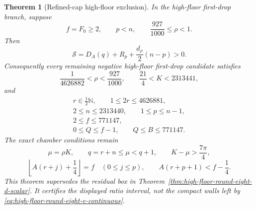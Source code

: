 \documentclass[11pt]{article}
\newtheorem{theorem}{Theorem}[section]
\theoremstyle{remark}
\newcommand{\N}{\mathbb N}
\begin{document}
\begin{theorem}[Refined-cap high-floor exclusion]
\label{thm:high-floor-round-eight-e-scalar}
In the high-floor first-drop branch, suppose
\[
 f=F_0\geq2,\qquad p<n,\qquad
 \frac{927}{1000}\leq\rho<1.
\]
Then
\begin{equation}
 \boxed{
 \mathcal S=D_A(q)+R_p+\frac{d_\rho}{2}(n-p)>0.}
 \label{eq:high-floor-round-eight-e-positive}
\end{equation}
Consequently every remaining negative high-floor first-drop candidate
satisfies
\begin{equation}
 \boxed{
 \frac1{4626882}<\rho<\frac{927}{1000},\qquad
 \frac{21}{4}<K<2313441,}
 \label{eq:high-floor-round-eight-e-continuous}
\end{equation}
and
\begin{equation}
 \boxed{
 \begin{gathered}
 r\in\tfrac12\N,\qquad 1\leq2r\leq4626881,\\
 2\leq n\leq2313440,\qquad 1\leq p\leq n-1,\\
 2\leq f\leq771147,\\
 0\leq Q\leq f-1,\qquad Q\leq B\leq771147.
 \end{gathered}}
 \label{eq:high-floor-round-eight-e-discrete}
\end{equation}
The exact chamber conditions remain
\begin{equation}
 \mu=\rho K,\qquad q=r+n\leq\mu<q+1,\qquad
 K-\mu>\frac{7\pi}{4},
 \label{eq:high-floor-round-eight-e-chamber-one}
\end{equation}
\begin{equation}
 \left\lfloor A(r+j)+\frac14\right\rfloor=f
 \quad(0\leq j\leq p),\qquad
 A(r+p+1)<f-\frac14.
 \label{eq:high-floor-round-eight-e-chamber-two}
\end{equation}
This theorem supersedes the residual box in
Theorem~\ref{thm:high-floor-round-eight-d-scalar}.  It certifies the
displayed ratio interval, not the compact walls left by
\eqref{eq:high-floor-round-eight-e-continuous}.
\end{theorem}
\end{document}
